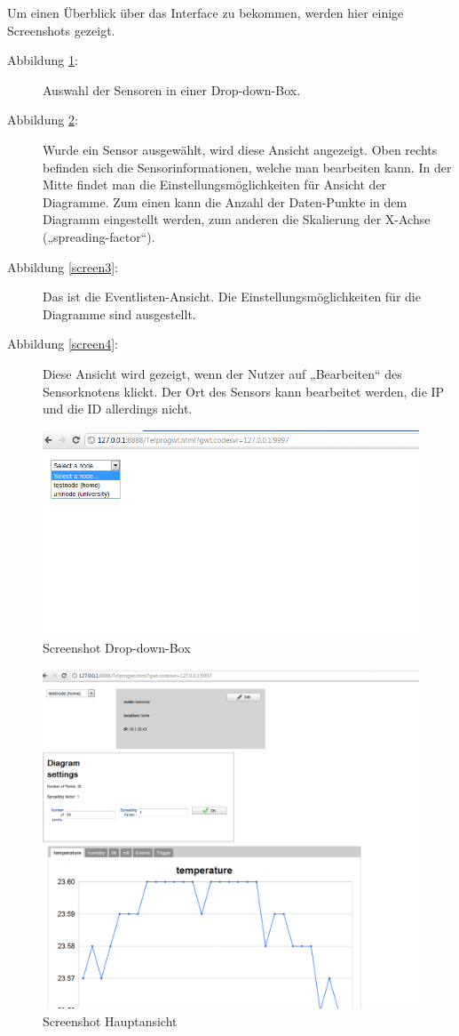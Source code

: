 \documentclass[12pt,a4paper,twoside]{article}
\begin{document}
Um einen Überblick über das Interface zu bekommen, werden hier einige Screenshots gezeigt.   
\begin{description}
\item[Abbildung \ref{screen1}:] Auswahl der Sensoren in einer Drop-down-Box. 
\item[Abbildung \ref{screen2}:] Wurde ein Sensor ausgewählt, wird diese Ansicht angezeigt. Oben rechts befinden sich die Sensorinformationen, welche man bearbeiten kann. In der Mitte findet man die Einstellungsmöglichkeiten für Ansicht der Diagramme. Zum einen kann die Anzahl der Daten-Punkte in dem Diagramm eingestellt werden, zum anderen die Skalierung der X-Achse („spreading-factor“).
\item[Abbildung \ref{screen3}:] Das ist die Eventlisten-Ansicht. Die Einstellungsmöglichkeiten für die Diagramme sind ausgestellt.
\item[Abbildung \ref{screen4}:] Diese Ansicht wird gezeigt, wenn der Nutzer auf „Bearbeiten“ des Sensorknotens klickt. Der Ort des Sensors kann bearbeitet werden, die IP und die ID allerdings nicht.
\end{description}

\begin{figure}[htbp]
   \centering
   \includegraphics[width=12cm]{fig/screen1.png}
   \caption{Screenshot Drop-down-Box}
   \label{screen1}
\end{figure}

\begin{figure}[htbp]
   \centering
   \includegraphics[width=12cm]{fig/screen2.png}
   \caption{Screenshot Hauptansicht}
   \label{screen2}
\end{figure}
\end{document}
